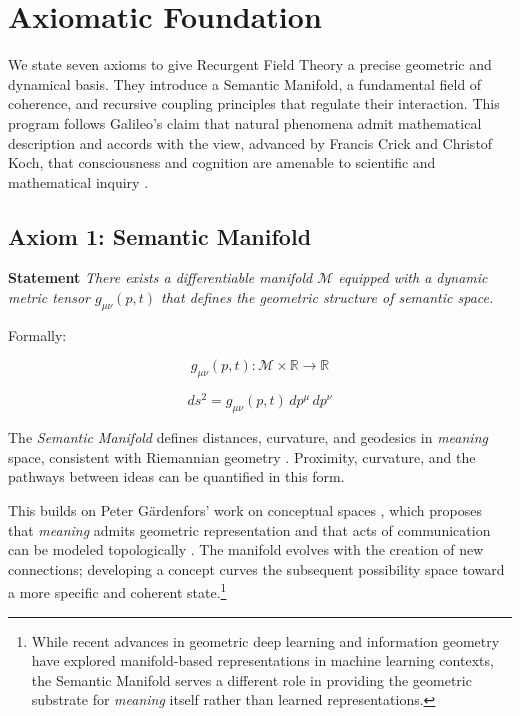 \chapter{Axiomatic Foundation}
\label{1:axiomatic_foundation}

We state seven axioms to give Recurgent Field Theory a precise geometric and dynamical basis. They introduce a Semantic Manifold, a fundamental field of coherence, and recursive coupling principles that regulate their interaction. This program follows Galileo's claim that natural phenomena admit mathematical description \autocite{Galilei1623} and accords with the view, advanced by Francis Crick and Christof Koch, that consciousness and cognition are amenable to scientific and mathematical inquiry \autocite{Crick1990, KochConsciousness2019}.


\section{Axiom 1: Semantic Manifold}
\label{1.1:axiom_1_semantic_manifold}

\textbf{Statement} \textit{There exists a differentiable manifold \(\mathcal{M}\) equipped with a dynamic metric tensor \(g_{\mu\nu}(p,t)\) that defines the geometric structure of semantic space.}

Formally:

\begin{equation}
g_{\mu\nu}(p,t) : \mathcal{M} \times \mathbb{R} \rightarrow \mathbb{R}
\end{equation}

\begin{equation}
ds^2 = g_{\mu\nu}(p,t) \, dp^\mu \, dp^\nu
\end{equation}

The \textit{Semantic Manifold} defines distances, curvature, and geodesics in \textit{meaning} space, consistent with Riemannian geometry \autocite{Riemann1868}. Proximity, curvature, and the pathways between ideas can be quantified in this form.

This builds on Peter Gärdenfors' work on conceptual spaces \autocite{Gardenfors2000}, which proposes that \textit{meaning} admits geometric representation and that acts of communication can be modeled topologically \autocite{Gardenfors2014}. The manifold evolves with the creation of new connections; developing a concept curves the subsequent possibility space toward a more specific and coherent state.\footnote{While recent advances in geometric deep learning \autocite{Bronstein2021} and information geometry \autocite{Amari2016} have explored manifold-based representations in machine learning contexts, the Semantic Manifold serves a different role in providing the geometric substrate for \textit{meaning} itself rather than learned representations.}


